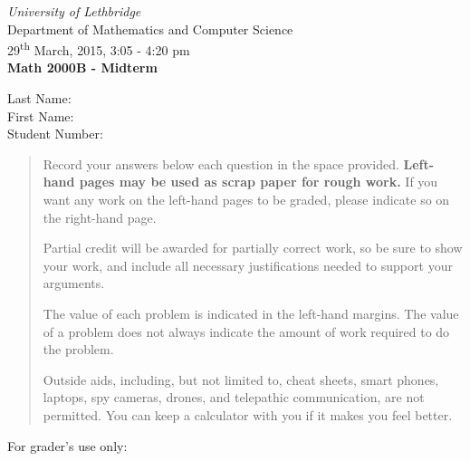 \documentclass[12pt]{article}
\newcommand{\skipline}{\vspace{12pt}}
\begin{document}
\author{Instructor: Sean Fitzpatrick}
\thispagestyle{plain}
\begin{center}
\emph{University of Lethbridge}\\
Department of Mathematics and Computer Science\\
29\textsuperscript{th} March, 2015, 3:05 - 4:20 pm\\
{\bf Math 2000B - Midterm}\\
\end{center}
\skipline \skipline \skipline \noindent \skipline
Last Name:\underline{\hspace{350pt}}\\
\skipline
First Name:\underline{\hspace{348pt}}\\
\skipline
Student Number:\underline{\hspace{322pt}}\\


\vspace{0.5in}


\begin{quote}
 Record your answers below each question in the space provided.    {\bf Left-hand pages may be used as scrap paper for rough work.}  If you want any work on the left-hand pages to be graded, please indicate so on the right-hand page.
 
 \bigskip
 
Partial credit will be awarded for partially correct work, so be sure to show your work, and include all necessary justifications needed to support your arguments. 

The value of each problem is indicated in the left-hand margins. The value of a problem does not always indicate the amount of work required to do the problem.

Outside aids, including, but not limited to, cheat sheets, smart phones, laptops, spy cameras, drones, and telepathic communication, are not permitted. You can keep a calculator with you if it makes you feel better.
\end{quote}


\vspace{0.5in}

For grader's use only:
\end{document}
